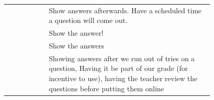 \begin{longtable}{r|p{0.8\linewidth}}
		& Show answers afterwards. Have a scheduled time a question will come out.                                                                                                                                                                                                                                                                                                                                                                                                                                                                                                                                                                                                                                                                         \\
		& Show the answer!                                                                                                                                                                                                                                                                                                                                                                                                                                                                                                                                                                                                                                                                                                                                 \\
		& Show the answers                                                                                                                                                                                                                                                                                                                                                                                                                                                                                                                                                                                                                                                                                                                                 \\
		& Showing answers after we run out of tries on a question, Having it be part of our grade (for incentive to use), having the teacher review the questions before putting them online                                                                                                                                                                                                                                                                                                                                                                                                                                                                                                                                                               \\

\end{longtable}
